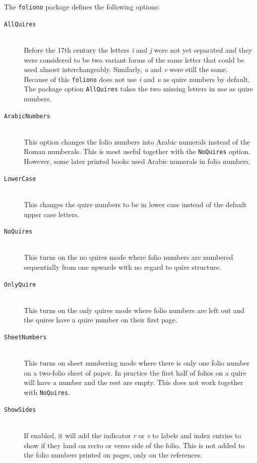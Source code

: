 \documentclass[a4paper, 12pt]{article}
\newcommand{\feature}[1]{\texttt{#1}}
\begin{document}
The \feature{foliono} package defines the following options:

\begin{description}
\item [\feature{AllQuires}] \mbox{} \\
  Before the 17th century the letters \emph{i} and \emph{j} were not
  yet separated and they were considered to be two variant forms of
  the same letter that could be used almost interchangeably.
  Similarly, \emph{u} and \emph{v} were still the same. Because of
  this \feature{foliono} does not use \emph{i} and \emph{u} as quire
  numbers by default. The package option \feature{AllQuires} takes the
  two missing letters in use as quire numbers.

\item [\feature{ArabicNumbers}] \mbox{} \\
  This option changes the folio numbers into Arabic numerals instead
  of the Roman numberals. This is most useful together with the
  \feature{NoQuires} option. However, some later printed books used
  Arabic numerals in folio numbers.
  
  \item [\feature{LowerCase}] \mbox{} \\
    This changes the quire numbers to be in lower case instead of the
    default upper case letters. 
    
  \item [\feature{NoQuires}] \mbox{} \\
    This turns on the no quires mode where folio numbers are numbered
    sequentially from one upwards with no regard to quire structure. 

  \item [\feature{OnlyQuire}] \mbox{} \\
    This turns on the only quires mode where folio numbers are left out
    and the quires have a quire number on their first page. 
  
  \item [\feature{SheetNumbers}] \mbox{} \\
    This turns on sheet numbering mode where there is only one folio
    number on a two-folio sheet of paper. In practice the first half
    of folios on a quire will have a number and the rest are empty.
    This does not work together with \feature{NoQuires}.

  \item [\feature{ShowSides}] \mbox{} \\
    If enabled, it will add the indicator \emph{r} or \emph{v} to
    labels and index entries to show if they land on recto or verso
    side of the folio. This is not added to the folio numbers printed
    on pages, only on the references. 


\end{description}
\end{document}
